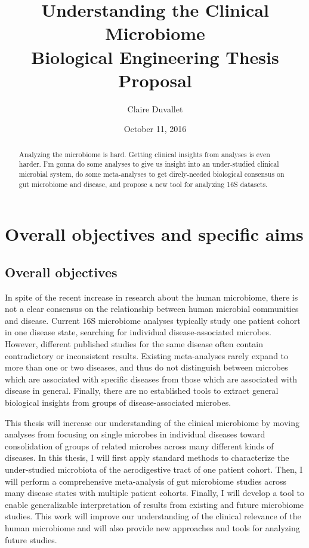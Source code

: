 \documentclass[12pt]{article}
\title{Understanding the Clinical Microbiome \\ Biological Engineering Thesis Proposal}
\author{Claire Duvallet}
\date{October 11, 2016}
\begin{document}
\maketitle
\newpage
\tableofcontents

\begin{abstract}
Analyzing the microbiome is hard. Getting clinical insights from analyses is even harder. I'm gonna do some analyses to give us insight into an under-studied clinical microbial system, do some meta-analyses to get direly-needed biological consensus on gut microbiome and disease, and propose a new tool for analyzing 16S datasets.
\end{abstract}
\newpage

\section{Overall objectives and specific aims}
\subsection{Overall objectives}

In spite of the recent increase in research about the human microbiome, there is not a clear consensus on the relationship between human microbial communities and disease. Current 16S microbiome analyses typically study one patient cohort in one disease state, searching for individual disease-associated microbes. However, different published studies for the same disease often contain contradictory or inconsistent results. Existing meta-analyses rarely expand to more than one or two diseases, and thus do not distinguish between microbes which are associated with specific diseases from those which are associated with disease in general. Finally, there are no established tools to extract general biological insights from groups of disease-associated microbes.

This thesis will increase our understanding of the clinical microbiome by moving analyses from focusing on single microbes in individual diseases toward consolidation of groups of related microbes across many different kinds of diseases. In this thesis, I will first apply standard methods to characterize the under-studied microbiota of the aerodigestive tract of one patient cohort. Then, I will perform a comprehensive meta-analysis of gut microbiome studies across many disease states with multiple patient cohorts. Finally, I will develop a tool to enable generalizable interpretation of results from existing and future microbiome studies. This work will improve our understanding of the clinical relevance of the human microbiome and will also provide new approaches and tools for analyzing future studies.
\end{document}
